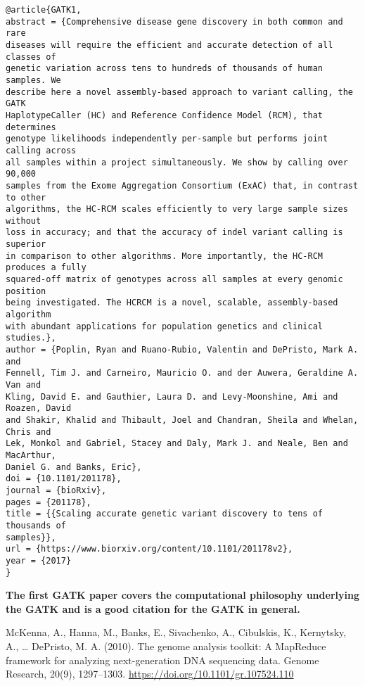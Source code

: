 \documentclass[]{article}
\begin{document}
\begin{verbatim}
@article{GATK1,
abstract = {Comprehensive disease gene discovery in both common and rare
diseases will require the efficient and accurate detection of all classes of
genetic variation across tens to hundreds of thousands of human samples. We
describe here a novel assembly-based approach to variant calling, the GATK
HaplotypeCaller (HC) and Reference Confidence Model (RCM), that determines
genotype likelihoods independently per-sample but performs joint calling across
all samples within a project simultaneously. We show by calling over 90,000
samples from the Exome Aggregation Consortium (ExAC) that, in contrast to other
algorithms, the HC-RCM scales efficiently to very large sample sizes without
loss in accuracy; and that the accuracy of indel variant calling is superior
in comparison to other algorithms. More importantly, the HC-RCM produces a fully
squared-off matrix of genotypes across all samples at every genomic position
being investigated. The HCRCM is a novel, scalable, assembly-based algorithm
with abundant applications for population genetics and clinical studies.},
author = {Poplin, Ryan and Ruano-Rubio, Valentin and DePristo, Mark A. and
Fennell, Tim J. and Carneiro, Mauricio O. and der Auwera, Geraldine A. Van and
Kling, David E. and Gauthier, Laura D. and Levy-Moonshine, Ami and Roazen, David
and Shakir, Khalid and Thibault, Joel and Chandran, Sheila and Whelan, Chris and
Lek, Monkol and Gabriel, Stacey and Daly, Mark J. and Neale, Ben and MacArthur,
Daniel G. and Banks, Eric},
doi = {10.1101/201178},
journal = {bioRxiv},
pages = {201178},
title = {{Scaling accurate genetic variant discovery to tens of thousands of
samples}},
url = {https://www.biorxiv.org/content/10.1101/201178v2},
year = {2017}
}
\end{verbatim}

\textbf{The first GATK paper covers the computational philosophy underlying the GATK and is a good citation for the GATK in general.}

McKenna, A., Hanna, M., Banks, E., Sivachenko, A., Cibulskis, K., Kernytsky, A., … DePristo, M. A. (2010). The genome analysis toolkit: A MapReduce framework for analyzing next-generation DNA sequencing data. Genome Research, 20(9), 1297–1303. \url{https://doi.org/10.1101/gr.107524.110}
\end{document}
